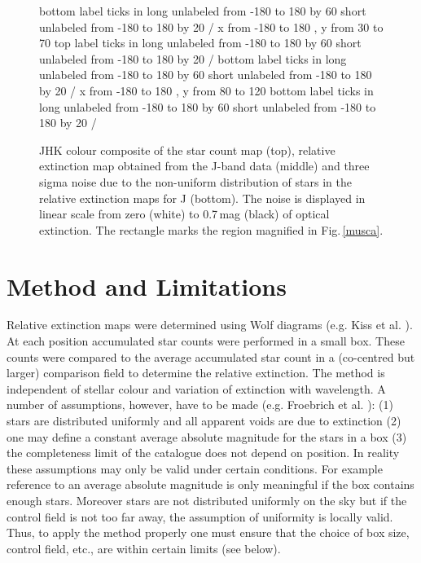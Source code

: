 \documentclass{aa}
\begin{document}
\begin{figure}[t]
\axis bottom label {}
ticks in long unlabeled from -180 to 180 by 60
      short unlabeled from -180 to 180 by 20 /
\setplotarea x from -180 to 180 , y from 30 to 70
\axis top label {}
ticks in long unlabeled from -180 to 180 by 60
      short unlabeled from -180 to 180 by 20 /
\axis bottom label {}
ticks in long unlabeled from -180 to 180 by 60
      short unlabeled from -180 to 180 by 20 /
\setplotarea x from -180 to 180 , y from 80 to 120
\axis bottom label {}
ticks in long unlabeled from -180 to 180 by 60
      short unlabeled from -180 to 180 by 20 /
\endpicture
\caption{\label{noise} JHK colour composite of the star count map (top),
relative extinction map obtained from the J-band data (middle) and three sigma
noise due to the non-uniform distribution of stars in the relative extinction
maps for J (bottom). The noise is displayed in linear scale from zero (white)
to 0.7\,mag (black) of optical extinction. The rectangle marks the region
magnified in Fig.\,\ref{musca}.}  
\end{figure}

\section{Method and Limitations} 
\label{limits}

Relative extinction maps were determined using Wolf diagrams (e.g. Kiss et al.
\cite{2000A&A...363..755K}). At each position accumulated star counts were
performed in a small box. These counts were compared to the average accumulated
star count in a (co-centred but larger) comparison field to determine the
relative extinction. The method is independent of stellar colour and variation
of extinction with wavelength. A number of assumptions, however, have to be
made (e.g. Froebrich et al. \cite{2005A&A.in.press.F}): (1) stars are
distributed uniformly and all apparent voids are due to extinction (2) one may
define a constant average absolute magnitude for the stars in a box (3) the
completeness limit of the catalogue does not depend on position. In reality
these assumptions may only be valid under certain conditions. For example
reference to an average absolute magnitude is only meaningful if the box
contains enough stars. Moreover stars are not distributed uniformly on the sky
but if the control field is not too far away, the assumption of uniformity is
locally valid. Thus, to apply the method properly one must ensure that the
choice of box size, control field, etc., are within certain limits (see below).
\end{document}
